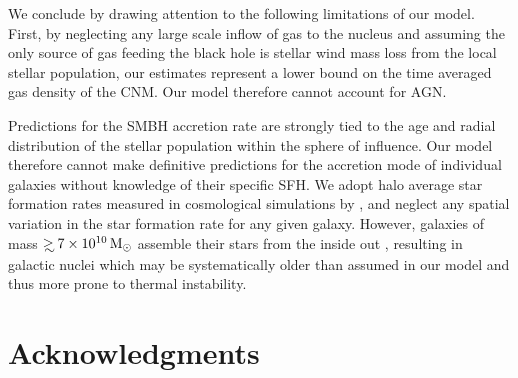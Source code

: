 \documentclass[usenatbib,fleqn]{mn2e}
\newcommand\lsim{\mathrel{\rlap{\lower4pt\hbox{\hskip1pt$\sim$}}
    \raise1pt\hbox{$<$}}}
\newcommand\gsim{\mathrel{\rlap{\lower4pt\hbox{\hskip1pt$\sim$}}
    \raise1pt\hbox{$>$}}}
\newcommand{\Mbh}[1][]{M_{\bullet#1}}
\begin{document}
We conclude by drawing attention to the following limitations of our
model.  First, by neglecting any large scale inflow of gas to the
nucleus and assuming the only source of gas feeding the black hole is
stellar wind mass loss from the local stellar population, our
estimates represent a lower bound on the time averaged gas density of
the CNM.  Our model therefore cannot account for AGN.

Predictions for the SMBH accretion rate are strongly tied to the age
and radial distribution of the stellar population within the sphere of
influence.  Our model therefore cannot make definitive predictions for
the accretion mode of individual galaxies without knowledge of their
specific SFH.  We adopt halo average star formation rates measured in
cosmological simulations by \citet{MosterNaab+:2013a}, and neglect any
spatial variation in the star formation rate for any given
galaxy. However, galaxies of mass $\gsim 7\times 10^{10} \Msun$
assemble their stars from the inside out
\citep{PerezCidFernandes+:2013a}, resulting in galactic nuclei which
may be systematically older than assumed in our model and thus more
prone to thermal instability.  



    

\section*{Acknowledgments}
\end{document}
